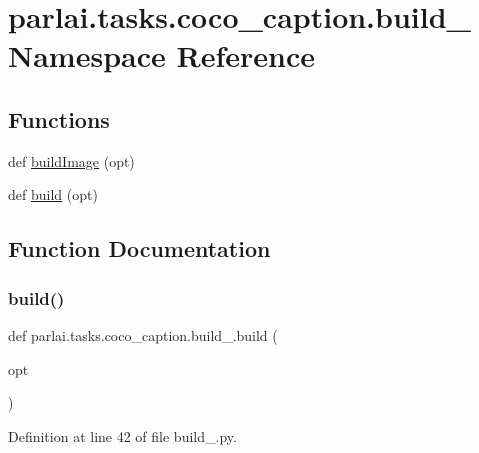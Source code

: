 \hypertarget{namespaceparlai_1_1tasks_1_1coco__caption_1_1build__2014}{}\section{parlai.\+tasks.\+coco\+\_\+caption.\+build\+\_ Namespace Reference}
\label{namespaceparlai_1_1tasks_1_1coco__caption_1_1build__2014}
\subsection*{Functions}
\begin{DoxyCompactItemize}
\item 
def \hyperlink{namespaceparlai_1_1tasks_1_1coco__caption_1_1build__2014_acd8cdd7a90cf4d7d348184dd2ca1545b}{build\+Image} (opt)
\item 
def \hyperlink{namespaceparlai_1_1tasks_1_1coco__caption_1_1build__2014_a4e0353d80ebb2d951fca7555c18548b4}{build} (opt)
\end{DoxyCompactItemize}


\subsection{Function Documentation}
\mbox{\label{namespaceparlai_1_1tasks_1_1coco__caption_1_1build__2014_a4e0353d80ebb2d951fca7555c18548b4}} 
\subsubsection{\texorpdfstring{build()}{build()}}
{\footnotesize\ttfamily def parlai.\+tasks.\+coco\+\_\+caption.\+build\+\_.\+build (\begin{DoxyParamCaption}\item[{}]{opt }\end{DoxyParamCaption})}



Definition at line 42 of file build\+\_.\+py.

\mbox{\label{namespaceparlai_1_1tasks_1_1coco__caption_1_1build__2014_acd8cdd7a90cf4d7d348184dd2ca1545b}} 
